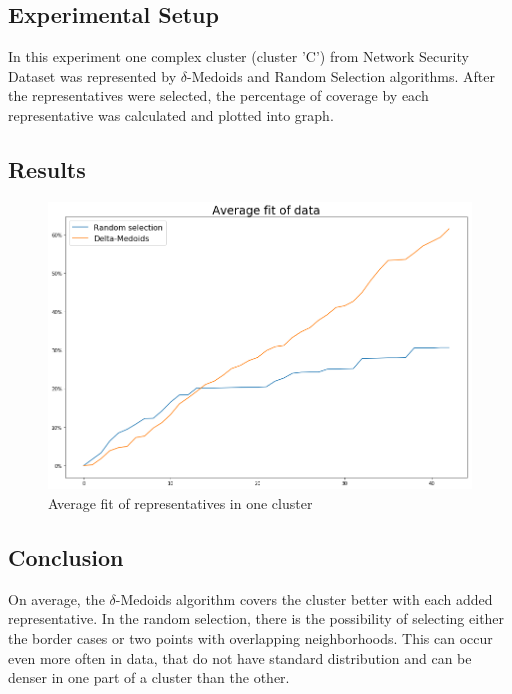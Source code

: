 \documentclass[thesis=B,english]{FITthesis}[2012/10/20]
\def\cbl{\color{blue}} %
\begin{document}
\subsection{Experimental Setup}
In this experiment one complex cluster (cluster 'C') from Network Security Dataset was represented by $\delta$-Medoids and Random Selection algorithms.
After the representatives were selected, the percentage of coverage by each representative was calculated and plotted into graph.


\subsection{Results}

\begin{figure}[H]
  \includegraphics[width=\linewidth]{img/exp5.png}
  \caption{\cbl Average fit of representatives in one cluster}
  \label{img:exp5}
\end{figure}

\subsection{Conclusion}
On average, the $\delta$-Medoids algorithm covers the cluster better with each added representative.
In the random selection, there is the possibility of selecting either the border cases or two points with overlapping neighborhoods.
This can occur even more often in data, that do not have standard distribution and can be denser in one part of a cluster than the other.



\end{document}
